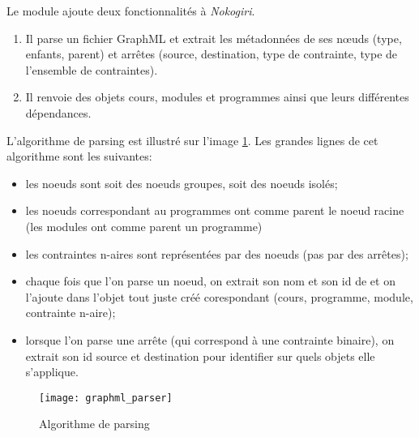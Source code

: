 Le module ajoute deux fonctionnalités à \textit{Nokogiri}.
\begin{enumerate}
  \item Il parse un fichier GraphML et extrait les métadonnées de ses nœuds (type, enfants, parent) et arrêtes (source, destination, type de contrainte, type de l'ensemble de contraintes). 
  \item Il renvoie des objets cours, modules et programmes ainsi que leurs différentes dépendances.  
\end{enumerate}

L'algorithme de parsing est illustré sur l'image \ref{fig:graphml_parser}. Les grandes lignes de cet algorithme sont les suivantes:

\begin{itemize}
\item les noeuds sont soit des noeuds groupes, soit des noeuds isolés;
\item les noeuds correspondant au programmes ont comme parent le noeud racine (les modules ont comme parent un programme)
\item les contraintes n-aires sont représentées par des noeuds (pas par des arrêtes);
\item chaque fois que l'on parse un noeud, on extrait son nom et son id de et on l'ajoute dans l'objet  tout juste créé corespondant (cours, programme, module, contrainte n-aire);
\item lorsque l'on parse une arrête (qui correspond à une contrainte binaire), on extrait son id source et destination pour identifier sur quels objets elle s'applique. 
\end{itemize}

\begin{figure}
\centering
\caption{Algorithme de parsing}
\label{fig:graphml_parser}
\texttt{[image: graphml\_parser]}
\end{figure}




